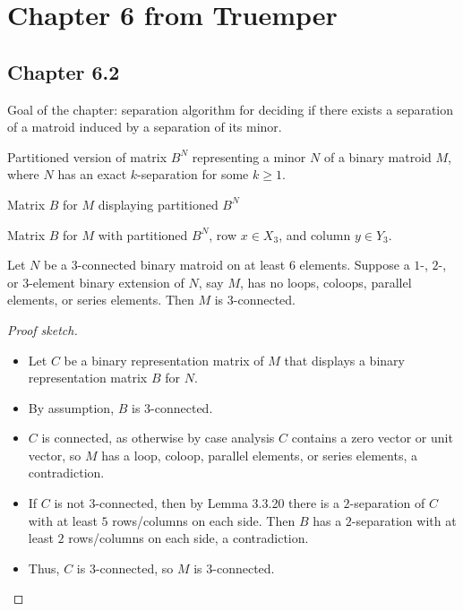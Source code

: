 \section{Chapter 6 from Truemper}

\subsection{Chapter 6.2}

Goal of the chapter: separation algorithm for deciding if there exists a separation of a matroid induced by a separation of its minor.

\begin{proposition}[6.2.1]
  \label{prop:6.2.1}
  Partitioned version of matrix $B^{N}$ representing a minor $N$ of a binary matroid $M$, where $N$ has an exact $k$-separation for some $k \geq 1$.
\end{proposition}

\begin{proposition}[6.2.3]
  \label{prop:6.2.3}
  Matrix $B$ for $M$ displaying partitioned $B^{N}$
\end{proposition}

\begin{proposition}[6.2.5]
  \label{prop:6.2.5}
  Matrix $B$ for $M$ with partitioned $B^{N}$, row $x \in X_{3}$, and column $y \in Y_{3}$.
\end{proposition}

\begin{lemma}[6.2.6]
  \label{lem:6.2.6}
  Let $N$ be a $3$-connected binary matroid on at least $6$ elements. Suppose a $1$-, $2$-, or $3$-element binary extension of $N$, say $M$, has no loops, coloops, parallel elements, or series elements. Then $M$ is $3$-connected.
\end{lemma}

\begin{proof}[Proof sketch]
  \begin{itemize}
    \item Let $C$ be a binary representation matrix of $M$ that displays a binary representation matrix $B$ for $N$.
    \item By assumption, $B$ is $3$-connected.
    \item $C$ is connected, as otherwise by case analysis $C$ contains a zero vector or unit vector, so $M$ has a loop, coloop, parallel elements, or series elements, a contradiction.
    \item If $C$ is not $3$-connected, then by Lemma 3.3.20 there is a $2$-separation of $C$ with at least $5$ rows/columns on each side. Then $B$ has a $2$-separation with at least $2$ rows/columns on each side, a contradiction.
    \item Thus, $C$ is $3$-connected, so $M$ is $3$-connected.
  \end{itemize}
\end{proof}


